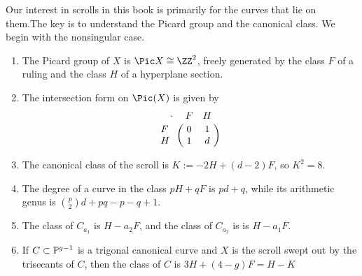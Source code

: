 Our interest in scrolls in this book is primarily for the curves that lie on them.The key is to understand the Picard group and the canonical class. We begin with the nonsingular case.

\begin{theorem}\label{pic of scroll}
\begin{enumerate} Suppose in addition that $a_{1}>0$.

\item The Picard group of $X$ is $\Pic X \cong \ZZ^2$, freely generated by  the class $F$ of a ruling and the class $H$ of a  hyperplane section. 
\item The
intersection form on $\Pic(X)$ is given by
$$
\bordermatrix{\kern 10pt\cdot&F&H\cr
F&0&1\cr
H&1&d
}
$$

\item The canonical class of the scroll is $K := -2H +(d-2)F$, so $K^2 = 8$.

\item The degree of a curve in the class $pH+qF$ is $pd+q$, while its arithmetic genus is
${p\choose 2}d+pq-p-q+1$.

\item The class of $C_{a_1}$
is $H-a_2F$, and the class of $C_{a_2}$ is 
is $H-a_1F$. 
\item If $C \subset \PP^{g-1}$ is a trigonal canonical curve and $X$ is the scroll swept out by the trisecants of $C$, then the class of $C$ is $3H+(4-g)F = H-K$
\end{enumerate}
\end{theorem}

